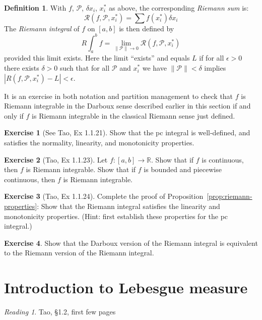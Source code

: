 \documentclass[11pt,oneside]{amsbook}
\newcommand{\RR}{{\mathbb R}}
\theoremstyle{definition}
\newtheorem{exerc}{Exercise}[section]
\theoremstyle{plain}
\theoremstyle{definition}
\newtheorem{defn}[thm]{Definition}
\theoremstyle{remark}
\newtheorem*{reading}{Reading}
\numberwithin{equation}{section}
\numberwithin{figure}{section}
\begin{document}
\begin{defn}
  With $f$, $\mathcal P$, $\delta x_i$, $x_i^*$ as above, the corresponding \emph{Riemann sum} is:
  \[\mathcal R(f,\mathcal  P,x_i^*)=\sum f(x_i^*)\delta x_i
  \]
  The \emph{Riemann integral} of $f$ on $[a,b]$ is then defined by
  \[R\int_a^b f=\lim_{\|\mathcal P\|\to0}\mathcal R(f,\mathcal P,x_i^*)
  \]
  provided this limit exists. Here the limit ``exists'' and equals $L$ if for all $\epsilon>0$ there exists $\delta>0$ such that for all $\mathcal P$ and $x_i^*$ we have $\|\mathcal P\|<\delta$ implies $|R(f,\mathcal P,x_i^*)-L|<\epsilon$.
\end{defn}

It is an exercise in both notation and partition management to check that $f$ is Riemann integrable in the Darboux sense described earlier in this section if and only if $f$ is Riemann integrable in the classical Riemann sense just defined.

\begin{exerc}[See Tao, Ex 1.1.21]
  Show that the pc integral is well-defined, and satisfies the normality, linearity, and monotonicity properties.
\end{exerc}

\begin{exerc}[Tao, Ex 1.1.23]
  Let $f\colon[a,b]\to\RR$. Show that if $f$ is continuous, then $f$ is Riemann integrable. Show that if $f$ is bounded and piecewise continuous, then $f$ is Riemann integrable.
\end{exerc}

\begin{exerc}[Tao, Ex 1.1.24]
  Complete the proof of Proposition~\ref{prop:riemann-properties}: Show that the Riemann integral satisfies the linearity and monotonicity properties. (Hint: first establish these properties for the pc integral.)
\end{exerc}

\begin{exerc}
  Show that the Darboux version of the Riemann integral is equivalent to the Riemann version of the Riemann integral.
\end{exerc}

\newpage
\section{Introduction to Lebesgue measure}

\begin{reading}
  Tao, \S1.2, first few pages
\end{reading}
\end{document}
